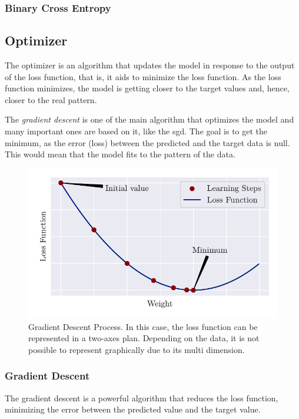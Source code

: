 \subsubsection*{Binary Cross Entropy}

\subsection{Optimizer}

The optimizer is an algorithm that updates the model in response to the output of the loss function, that is, it aids to minimize the loss function. 
As the loss function minimizes, the model is getting closer to the target values and, hence, closer to the real pattern.

The \emph{gradient descent} is one of the main algorithm \citep{nesterov2004} that optimizes the model and many important ones are based on it, like the \gls*{sgd}. The goal is to get the minimum, as the error (loss) between the predicted and the target data is null. This would mean that the model fits to the pattern of the data.
%
\begin{figure}[H]
    \centering
    \includegraphics{figures/3review/nn/gradient_descent.pdf}
    \caption[Gradient Descent Process]{Gradient Descent Process. In this case, the loss function can be represented in a two-axes plan. Depending on the data, it is not possible to represent graphically due to its multi dimension.}
\end{figure}

\subsubsection*{Gradient Descent} 

The gradient descent is a powerful algorithm that reduces the loss function, minimizing the error between the predicted value and the target value.

